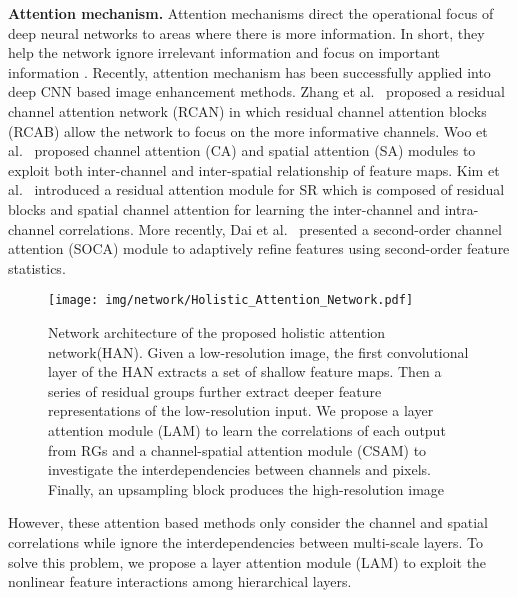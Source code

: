 \documentclass[runningheads]{llncs}
\begin{document}
\textbf{Attention mechanism.} Attention mechanisms direct the operational focus of deep neural networks to areas where there is more information. In short, they help the network ignore irrelevant information and focus on important information \cite{hu2018squeeze,hu2019channel}. 
Recently, attention mechanism has been successfully applied into deep CNN based image enhancement methods. 
Zhang et al.~\cite{zhang2018image} proposed a residual channel attention network (RCAN) in which residual channel attention blocks (RCAB) allow the network to focus on the more informative channels. 
Woo et al.~\cite{woo2018cbam} proposed channel attention (CA) and spatial attention (SA) modules to exploit both inter-channel and inter-spatial relationship of feature maps. 
Kim et al.~\cite{kim2018ram} introduced a residual attention module for SR which is composed of residual blocks and spatial channel attention for learning the inter-channel and intra-channel correlations. More recently, Dai et al.~\cite{dai2019second} presented a second-order channel attention (SOCA) module to adaptively refine features using second-order feature statistics.
\begin{figure}[t]\footnotesize
	\begin{center}
		\texttt{[image: img/network/Holistic\_Attention\_Network.pdf]}
	\end{center}


	\caption{Network architecture of the proposed holistic attention network(HAN). Given a low-resolution image, the first convolutional layer of the HAN extracts a set of shallow feature maps. Then a series of residual groups further extract deeper feature representations of the low-resolution input. We propose a layer attention module (LAM) to learn the correlations of each output from RGs and a channel-spatial attention module (CSAM) to investigate the interdependencies between channels and pixels. Finally, an upsampling block produces the high-resolution image
	}

	\label{fig-Holistic_Attention_Network}
\end{figure}

However, these attention based methods only consider the channel and spatial correlations while ignore the interdependencies between multi-scale layers. To solve this problem, we propose a layer attention module (LAM) to
exploit the nonlinear feature interactions among hierarchical layers.  
\end{document}
